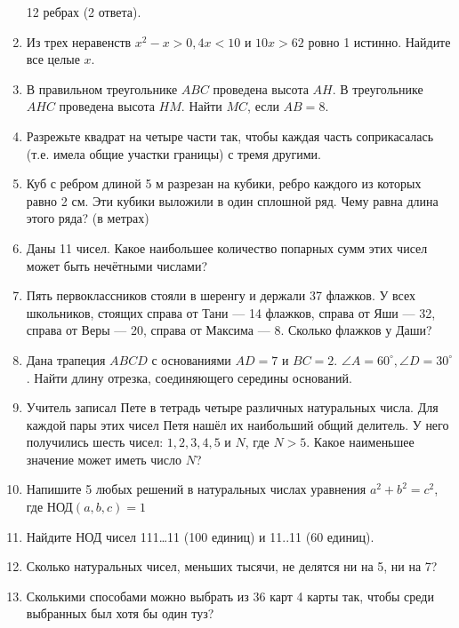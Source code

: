 \documentclass[12pt]{article}
\begin{document}
\begin{enumerate}
12 ребрах (2 ответа).
\item Из трех неравенств $x^2 - x > 0, 4x < 10$ и $10x > 62$ ровно 1 истинно. Найдите все целые $x$.
\item В правильном треугольнике $ABC$ проведена высота $AH$. В треугольнике $AHC$ проведена высота $HM$.
Найти $MC$, если $AB = 8$.
\item Разрежьте квадрат на четыре части так, чтобы каждая часть соприкасалась (т.е. имела общие
участки границы) с тремя другими.
\item Куб с ребром длиной 5 м разрезан на кубики, ребро каждого из которых равно 2 см. Эти кубики
выложили в один сплошной ряд. Чему равна длина этого ряда? (в метрах)
\item Даны 11 чисел. Какое наибольшее количество попарных сумм этих чисел может быть нечётными
числами?
\item Пять первоклассников стояли в шеренгу и держали 37 флажков. У всех школьников, стоящих справа
от Тани — 14 флажков, справа от Яши — 32, справа от Веры — 20, справа от Максима — 8. Сколько
флажков у Даши?
\item Дана трапеция $ABCD$ с основаниями $AD = 7$ и $BC = 2$. $\angle A = 60^{\circ}, \angle D =
30^{\circ}$. Найти длину отрезка, соединяющего середины оснований.
\item Учитель записал Пете в тетрадь четыре различных натуральных числа. Для каждой пары этих
чисел Петя нашёл их наибольший общий делитель. У него получились шесть чисел: $1, 2, 3, 4, 5$ и $N$, где
$N > 5$. Какое наименьшее значение может иметь число $N$?
\item Напишите 5 любых решений в натуральных числах уравнения $a^2 + b^2 = c^2$, где НОД$(a,b,c)=1$
\item Найдите НОД чисел 111…11 (100 единиц) и 11..11 (60 единиц).
\item Сколько натуральных чисел, меньших тысячи, не делятся ни на 5, ни на 7?
\item Сколькими способами можно выбрать из 36 карт 4 карты так, чтобы среди выбранных
был хотя бы один туз?
\end{enumerate}
\end{document}
